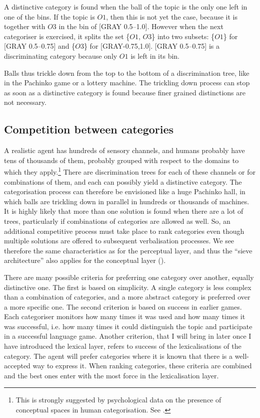 A distinctive category is found when the ball of the 
topic is the only one left in one of the bins. 
If the topic is $O1$, then this is not yet the 
case, because it is together with $O3$ in the 
bin of [GRAY 0.5–1.0]. However when the next categoriser
is exercised, it splits the set \{$O1$, $O3$\} 
into two subsets: \{$O1$\} for [GRAY 0.5–0.75]
and \{$O3$\} for [GRAY-0.75,1.0]. 
[GRAY 0.5–0.75] is a discriminating category because only 
$O1$ is left in its bin. 

Balls thus trickle down from the top to the bottom of 
a discrimination tree, like in the Pachinko game or 
a lottery machine. The trickling down process can stop as
soon as a distinctive category is found because finer grained 
distinctions are not necessary. 

\subsection{Competition between categories}

A realistic agent has hundreds of sensory
channels, and humans probably have tens of thousands
of them, probably grouped with respect to the domains
to which they apply.\footnote{
This is strongly suggested by psychological 
data on the presence of conceptual spaces in human 
categorisation. See \cite{Gardenfors:1999}.} There are discrimination trees
for each of 
these channels or for combinations of them, and 
each can possibly yield a distinctive
category. The categorisation process can therefore be
envisioned like a huge Pachinko hall, in which
balls are trickling down in parallel in hundreds or 
thousands of machines. It is highly 
likely that more than one solution is found
when there are a lot of trees, particularly 
if combinations of categories are allowed as well. 
So, an additional competitive process must 
take place to rank categories even 
though multiple solutions are offered to subsequent
verbalisation processes. We see therefore the same
characteristics as for the perceptual layer, and thus
the ``sieve architecture'' also 
applies for the conceptual layer (). 
 
There are many possible criteria for preferring 
one category over another, equally distinctive one. 
The first is based on 
simplicity. A single category is less complex than 
a combination of categories, and a more abstract category 
is preferred over a more specific one. 
The second criterion is based on success in earlier games. 
Each categoriser monitors how many
times it was used and how many times
it was successful, i.e. how many times it could distinguish
the topic and participate in a successful language game. 
Another criterion, that I will bring in later 
once I have introduced the lexical layer, refers to 
success of the lexicalisations of the category. The agent 
will prefer categories where it is known that there is
a well-accepted way to express it. 
When ranking categories, these criteria are combined
and the best ones enter with the most force in the 
lexicalisation layer. 

